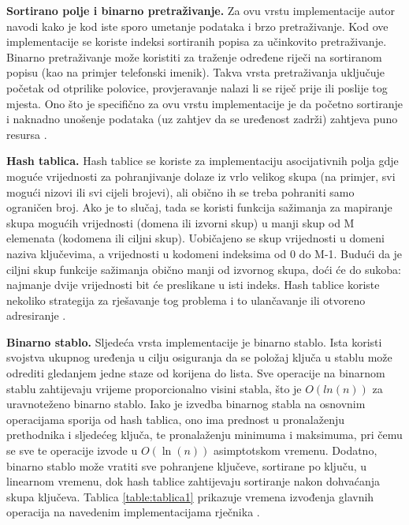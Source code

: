 \documentclass{foi}
\begin{document}
\textbf{Sortirano polje i binarno pretraživanje.}
Za ovu vrstu implementacije autor navodi kako je kod iste sporo umetanje podataka i brzo pretraživanje. Kod ove implementacije se koriste indeksi sortiranih popisa za učinkovito pretraživanje. Binarno pretraživanje može koristiti za traženje određene riječi na sortiranom popisu (kao na primjer telefonski imenik). Takva vrsta pretraživanja uključuje početak od otprilike polovice, provjeravanje nalazi li se riječ prije ili poslije tog mjesta. Ono što je specifično za ovu vrstu implementacije je da početno sortiranje i naknadno unošenje podataka (uz zahtjev da se uređenost zadrži) zahtjeva puno resursa \cite{la2021advanced}.

\textbf{Hash tablica.}
Hash tablice se koriste za implementaciju asocijativnih polja gdje moguće vrijednosti za pohranjivanje dolaze iz vrlo velikog skupa (na primjer, svi mogući nizovi ili svi cijeli brojevi), ali obično ih se treba pohraniti samo ograničen broj. Ako je to slučaj, tada se koristi funkcija sažimanja za mapiranje skupa mogućih vrijednosti (domena ili izvorni skup) u manji skup od M elemenata (kodomena ili ciljni skup). Uobičajeno se skup vrijednosti u domeni naziva ključevima, a vrijednosti u kodomeni indeksima od 0 do M-1. Budući da je ciljni skup funkcije sažimanja obično manji od izvornog skupa, doći će do sukoba: najmanje dvije vrijednosti bit će preslikane u isti indeks. Hash tablice koriste nekoliko strategija za rješavanje tog problema i to ulančavanje ili otvoreno adresiranje \cite{la2021advanced}.

\textbf{Binarno stablo.}
Sljedeća vrsta implementacije je binarno stablo. Ista koristi svojstva ukupnog uređenja u cilju osiguranja da se položaj ključa u stablu može odrediti gledanjem jedne staze od korijena do lista. Sve operacije na binarnom stablu zahtijevaju vrijeme proporcionalno visini stabla, što je $O(ln(n))$ za uravnoteženo binarno stablo. Iako je izvedba binarnog stabla na osnovnim operacijama sporija od hash tablica, ono ima prednost u pronalaženju prethodnika i sljedećeg ključa, te pronalaženju minimuma i maksimuma, pri čemu se sve te operacije izvode u $O(\ln(n))$ asimptotskom vremenu. Dodatno, binarno stablo može vratiti sve pohranjene ključeve, sortirane po ključu, u linearnom vremenu, dok hash tablice zahtijevaju sortiranje nakon dohvaćanja skupa ključeva.
\newpage
Tablica \ref{table:tablica1} prikazuje vremena izvođenja glavnih operacija na navedenim implementacijama rječnika \cite{la2021advanced}.
\end{document}
